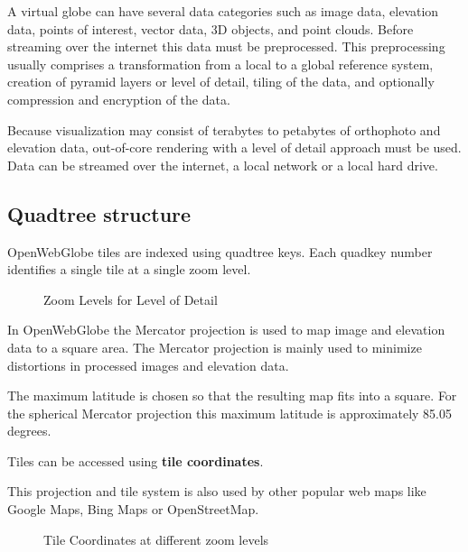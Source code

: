 \documentclass[
	12pt,
	a4paper,
	english,	
	appendixprefix,				     			        
	openany,		     	
	abstracton,		    		    
 	BCOR8mm,		    
]{scrartcl}
\newcommand{\bildorig}[2]{\begin{figure}[H]
      \centering
      \noindent{\texttt{[image: \#1]}}\caption{#2}
\end{figure}}
\newcommand{\bildhalf}[2]{\begin{figure}[H]
      \centering
      \noindent{\texttt{[image: \#1]}}\caption{#2}
\end{figure}}
\begin{document}
A virtual globe can have several data categories such as image data, elevation data,
points of interest, vector data, 3D objects, and point clouds. Before streaming over the internet
this data must be preprocessed. This preprocessing usually comprises a transformation from a local 
to a global reference system, creation of pyramid layers or level of detail, tiling of the data, and optionally compression and encryption
of the data.\cite{Christen2010}

Because visualization may consist of terabytes to petabytes of orthophoto and elevation data,
out-of-core rendering with a level of detail approach must be used. Data can
be streamed over the internet, a local network or a local hard drive.\cite{Christen2010}

\subsection{Quadtree structure}

OpenWebGlobe tiles are indexed using quadtree keys. 
Each quadkey number identifies a single tile at a single zoom level.

\bildorig{images/pyramid.png}{Zoom Levels for Level of Detail}

In OpenWebGlobe the Mercator projection\cite{Snyder1987} is used to map image and elevation data to a square area. 
The Mercator projection is mainly used to minimize distortions in processed images and elevation data. 

The maximum latitude is chosen so that the resulting
map fits into a square. For the spherical Mercator projection this maximum
latitude is approximately 85.05 degrees. 

Tiles can be accessed using \textbf{tile coordinates}.

This projection and tile system is also used by other popular web maps like Google Maps\cite{GoogleMaps}, Bing Maps\cite{BingMapsTileSystem} or OpenStreetMap\cite{osmtilenames}.

\bildhalf{images/tiles.png}{Tile Coordinates at different zoom levels}


\end{document}
